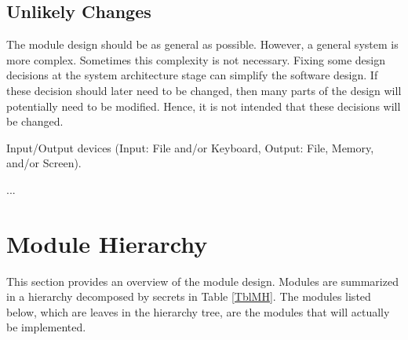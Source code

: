 \documentclass[12pt, titlepage]{article}
\newcounter{ucnum}
\newcommand{\uctheucnum}{UC\theucnum}
\begin{document}
\subsection{Unlikely Changes} \label{SecUchange}

The module design should be as general as possible. However, a general system is
more complex. Sometimes this complexity is not necessary. Fixing some design
decisions at the system architecture stage can simplify the software design. If
these decision should later need to be changed, then many parts of the design
will potentially need to be modified. Hence, it is not intended that these
decisions will be changed.

\begin{description}
\item[ \uctheucnum \label{ucIO}:] Input/Output devices
  (Input: File and/or Keyboard, Output: File, Memory, and/or Screen).
\item ...
\end{description}

\section{Module Hierarchy} \label{SecMH}

This section provides an overview of the module design. Modules are summarized
in a hierarchy decomposed by secrets in Table \ref{TblMH}. The modules listed
below, which are leaves in the hierarchy tree, are the modules that will
actually be implemented.
\end{document}
